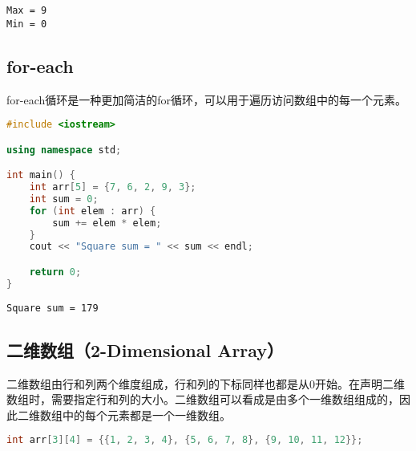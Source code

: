 \begin{tcolorbox}
	\begin{verbatim}
Max = 9
Min = 0
	\end{verbatim}
\end{tcolorbox}

\vspace{0.5cm}

\subsection{for-each}

for-each循环是一种更加简洁的for循环，可以用于遍历访问数组中的每一个元素。\\


\begin{lstlisting}[language=C++]
#include <iostream>

using namespace std;

int main() {
	int arr[5] = {7, 6, 2, 9, 3};
	int sum = 0;
	for (int elem : arr) {
		sum += elem * elem;
	}
	cout << "Square sum = " << sum << endl;

	return 0;
}
\end{lstlisting}

\begin{tcolorbox}
	\begin{verbatim}
Square sum = 179
	\end{verbatim}
\end{tcolorbox}

\vspace{0.5cm}

\subsection{二维数组（2-Dimensional Array）}

二维数组由行和列两个维度组成，行和列的下标同样也都是从0开始。在声明二维数组时，需要指定行和列的大小。二维数组可以看成是由多个一维数组组成的，因此二维数组中的每个元素都是一个一维数组。

\vspace{-0.5cm}

\begin{lstlisting}[language=C++]
int arr[3][4] = {{1, 2, 3, 4}, {5, 6, 7, 8}, {9, 10, 11, 12}};
\end{lstlisting}

\begin{table}[H]
	\centering
\end{table}

